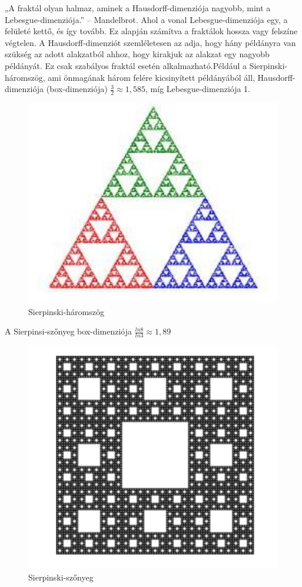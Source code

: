 „A fraktál olyan halmaz, aminek a Hausdorff-dimenziója nagyobb, mint a Lebesgue-dimenziója.” –
Mandelbrot.
Ahol a vonal Lebesgue-dimenziója egy, a felületé kettő, és így tovább. Ez alapján számítva a fraktálok
hossza vagy felszíne végtelen. A Hausdorff-dimenziót szemléletesen az adja, hogy hány példányra van
szükség az adott alakzatból ahhoz, hogy kirakjuk az alakzat egy nagyobb példányát. Ez csak szabályos
fraktál esetén alkalmazható.Például a Sierpinski-háromszög, ami önmagának három felére kicsinyített példányából áll, Hausdorff-dimenziója (box-dimenziója) $\frac{3}{2}\approx1,585$, míg Lebesgue-dimenziója 1.

\begin{figure}[H]
	\centering		
	\includegraphics[scale=0.3]{Images/Sierpinski-triangle.png}
	\caption{Sierpinski-háromszög}
\end{figure}	

A Sierpinsi-szőnyeg box-dimenziója $\frac{ln8}{ln3}\approx1,89$

\begin{figure}[H]
	\centering	
	\includegraphics[scale=0.3]{Images/Sierpinski-szonyeg.png}
	\caption{Sierpinski-szőnyeg}	
\end{figure}

